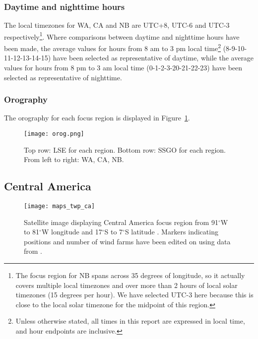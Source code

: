 \subsubsection{Daytime and nighttime hours}

The local timezones for \ac{WA}, \ac{CA} and \ac{NB} are UTC+8, UTC-6 and UTC-3 respectively\footnote{The focus region for \ac{NB} spans across 35 degrees of longitude, so it actually covers multiple local timezones and over more than 2 hours of local solar timezones (15 degrees per hour). We have selected UTC-3 here because this is close to the local solar timezone for the midpoint of this region.}. Where comparisons between daytime and nighttime hours have been made, the average values for hours from 8 am to 3 pm local time\footnote{Unless otherwise stated, all times in this report are expressed in local time, and hour endpoints are inclusive.} (8-9-10-11-12-13-14-15) have been selected as representative of daytime, while the average values for hours from 8 pm to 3 am local time (0-1-2-3-20-21-22-23) have been selected as representative of nighttime.

\subsubsection{Orography}

The orography for each focus region is displayed in Figure~\ref{fig:orog}.

\begin{figure}[!ht]
	\centering
	\texttt{[image: orog.png]}
	\caption[Orography for all focus regions]{Top row: \acf{LSE} for each region. Bottom row: \acf{SSGO} for each region. From left to right: \acl{WA}, \acl{CA}, \acl{NB}.}
	\label{fig:orog}
\end{figure}

\subsection{Central America}

\begin{figure}[!ht]
	\centering
	\texttt{[image: maps\_twp\_ca]}
	\caption[Central America Map]{Satellite image displaying Central America focus region from 91$^\circ$W to 81$^\circ$W longitude and 17$^\circ$S to 7$^\circ$S latitude \citep{maps_ca}. Markers indicating positions and number of wind farms have been edited on using data from \citep{twp_hd, twp_nc, twp_cr}.}
	\label{fig:maps_twp_ca}
\end{figure}

